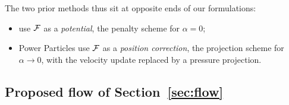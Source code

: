\documentclass[main.tex]{subfiles}
\begin{document}
The two prior methods thus sit at opposite ends of our formulations:
\begin{itemize}
  \item \citet{Gallouet2018Lagrangian} use $\mathcal{F}$ as a \emph{potential}, \ie the penalty scheme for $\alpha = 0$;
  \item Power Particles \cite{deGoes2015PowerParticles} use $\mathcal{F}$ as a \emph{position correction}, \ie the projection scheme for $\alpha \to 0$, with the velocity update replaced by a pressure projection.
\end{itemize}

\subsection*{Proposed flow of Section~\ref{sec:flow}}
\end{document}
